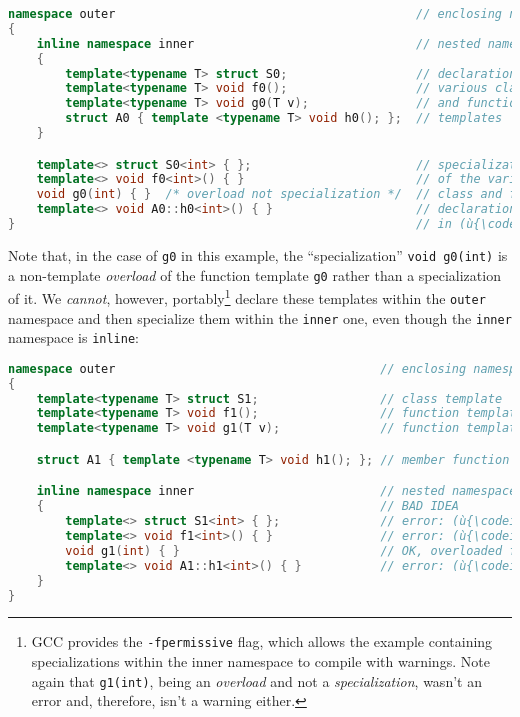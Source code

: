 \begin{lstlisting}[language=C++]
namespace outer                                          // enclosing namespace
{
    inline namespace inner                               // nested namespace
    {
        template<typename T> struct S0;                  // declarations of
        template<typename T> void f0();                  // various class
        template<typename T> void g0(T v);               // and function
        struct A0 { template <typename T> void h0(); };  // templates
    }

    template<> struct S0<int> { };                       // specializations
    template<> void f0<int>() { }                        // of the various
    void g0(int) { }  /* overload not specialization */  // class and function
    template<> void A0::h0<int>() { }                    // declarations above
}                                                        // in (ù{\codeincomments{outer}}ù) namespace
\end{lstlisting}
    
\noindent Note that, in the case of \texttt{g0} in this example, the
``specialization'' \texttt{void}~\texttt{g0(int)} is a non-template
\emph{overload} of the function template \texttt{g0} rather than a
specialization of it. We \emph{cannot}, however,
portably{\cprotect\footnote{GCC provides the \texttt{-fpermissive} flag,
which allows the example containing specializations within the inner
namespace to compile with warnings. Note again that \texttt{g1(int)},
being an \emph{overload} and not a \emph{specialization}, wasn't an
  error and, therefore, isn't a warning either.}} declare these
templates within the \texttt{outer} namespace and then specialize them
within the \texttt{inner} one, even though the \texttt{inner} namespace
is \texttt{inline}:

\begin{lstlisting}[language=C++]
namespace outer                                     // enclosing namespace
{
    template<typename T> struct S1;                 // class template
    template<typename T> void f1();                 // function template
    template<typename T> void g1(T v);              // function template

    struct A1 { template <typename T> void h1(); }; // member function template

    inline namespace inner                          // nested namespace
    {                                               // BAD IDEA
        template<> struct S1<int> { };              // error: (ù{\codeincomments{S1}}ù) not a template
        template<> void f1<int>() { }               // error: (ù{\codeincomments{f1}}ù) not a template
        void g1(int) { }                            // OK, overloaded function
        template<> void A1::h1<int>() { }           // error: (ù{\codeincomments{h1}}ù) not a template
    }
}
\end{lstlisting}
    
